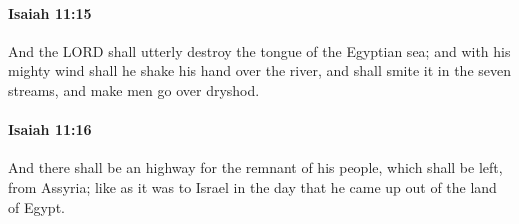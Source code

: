 		\paragraph{Isaiah 11:15} %
			\label{ISAIAH-11-15}

			And the LORD shall utterly destroy the tongue of the Egyptian sea; and with his mighty wind shall he shake his hand over the river, and shall smite it in the seven streams, and make men go over dryshod.


		\paragraph{Isaiah 11:16} %
			\label{ISAIAH-11-16}

			And there shall be an highway for the remnant of his people, which shall be left, from Assyria; like as it was to Israel in the day that he came up out of the land of Egypt.


